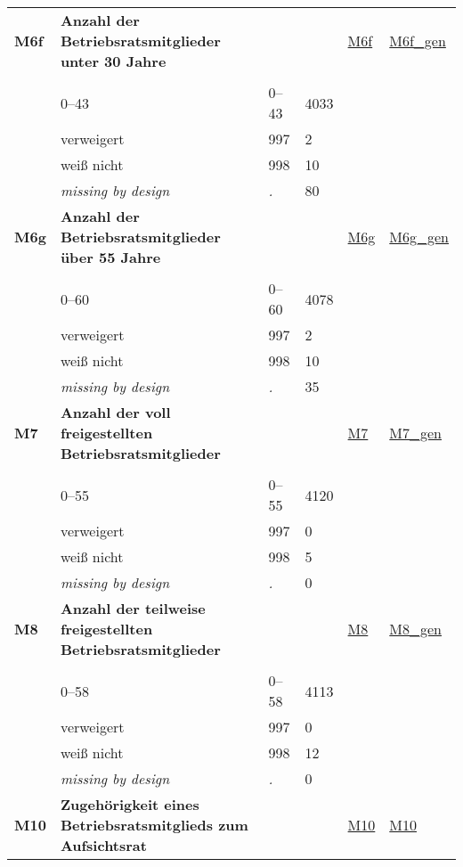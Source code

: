 \begin{longtable}{| L{2.45cm} | L{6cm} | C{1.5cm} | R{1cm} | C{2.25cm} | C{2.25cm} |}
   \midrule
\textbf{M6f}\label{var:M6f} & \textbf{Anzahl der Betriebsratsmitglieder unter 30 Jahre} &  &  & \hyperref[M6f]{M6f} & \hyperref[var:suf:M6f:gen]{M6f\_gen} \\ 
   &  &  &  &  &  \\ 
   & 0--43 & 0--43 & 4033 &  &  \\ 
   & verweigert & 997 & 2 &  &  \\ 
   & weiß nicht & 998 & 10 &  &  \\ 
   & \textit{missing by design} & \textit{.} & 80 &  &  \\ 
   \midrule
\textbf{M6g}\label{var:M6g} & \textbf{Anzahl der Betriebsratsmitglieder über 55 Jahre} &  &  & \hyperref[M6g]{M6g} & \hyperref[var:suf:M6g:gen]{M6g\_gen} \\ 
   &  &  &  &  &  \\ 
   & 0--60 & 0--60 & 4078 &  &  \\ 
   & verweigert & 997 & 2 &  &  \\ 
   & weiß nicht & 998 & 10 &  &  \\ 
   & \textit{missing by design} & \textit{.} & 35 &  &  \\ 
   \midrule
\textbf{M7}\label{var:M7} & \textbf{Anzahl der voll freigestellten Betriebsratsmitglieder} &  &  & \hyperref[M7]{M7} & \hyperref[var:suf:M7:gen]{M7\_gen} \\ 
   &  &  &  &  &  \\ 
   & 0--55 & 0--55 & 4120 &  &  \\ 
   & verweigert & 997 & 0 &  &  \\ 
   & weiß nicht & 998 & 5 &  &  \\ 
   & \textit{missing by design} & \textit{.} & 0 &  &  \\ 
   \midrule
\textbf{M8}\label{var:M8} & \textbf{Anzahl der teilweise freigestellten Betriebsratsmitglieder} &  &  & \hyperref[M8]{M8} & \hyperref[var:suf:M8:gen]{M8\_gen} \\ 
   &  &  &  &  &  \\ 
   & 0--58 & 0--58 & 4113 &  &  \\ 
   & verweigert & 997 & 0 &  &  \\ 
   & weiß nicht & 998 & 12 &  &  \\ 
   & \textit{missing by design} & \textit{.} & 0 &  &  \\ 
   \midrule
\textbf{M10}\label{var:M10} & \textbf{Zugehörigkeit eines Betriebsratsmitglieds zum Aufsichtsrat} &  &  & \hyperref[M10]{M10} & \hyperref[var:suf:M10]{M10} \\ 

\end{longtable}
